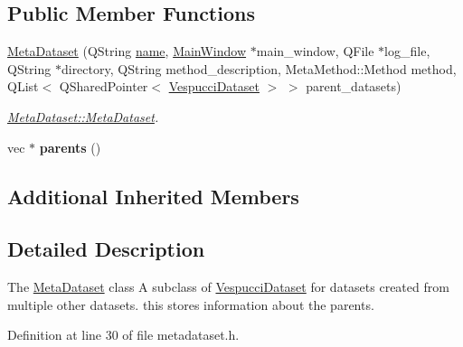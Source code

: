 \subsection*{Public Member Functions}
\begin{DoxyCompactItemize}
\item 
\hyperlink{class_meta_dataset_a18bdddde9c879805c1f6be74b30728d3}{Meta\+Dataset} (Q\+String \hyperlink{class_vespucci_dataset_ae5b30cb466acfdf741b360bc4f897cc9}{name}, \hyperlink{class_main_window}{Main\+Window} $\ast$main\+\_\+window, Q\+File $\ast$log\+\_\+file, Q\+String $\ast$directory, Q\+String method\+\_\+description, Meta\+Method\+::\+Method method, Q\+List$<$ Q\+Shared\+Pointer$<$ \hyperlink{class_vespucci_dataset}{Vespucci\+Dataset} $>$ $>$ parent\+\_\+datasets)
\begin{DoxyCompactList}\small\item\em \hyperlink{class_meta_dataset_a18bdddde9c879805c1f6be74b30728d3}{Meta\+Dataset\+::\+Meta\+Dataset}. \end{DoxyCompactList}\item 
\hypertarget{class_meta_dataset_a0cca41844d506f070c4b8b8f6e101b18}{vec $\ast$ {\bfseries parents} ()}\label{class_meta_dataset_a0cca41844d506f070c4b8b8f6e101b18}

\end{DoxyCompactItemize}
\subsection*{Additional Inherited Members}


\subsection{Detailed Description}
The \hyperlink{class_meta_dataset}{Meta\+Dataset} class A subclass of \hyperlink{class_vespucci_dataset}{Vespucci\+Dataset} for datasets created from multiple other datasets. this stores information about the parents. 

Definition at line 30 of file metadataset.\+h.



